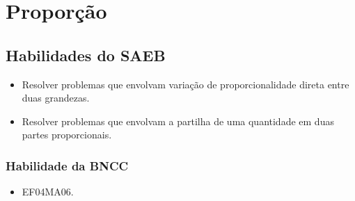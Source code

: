 \chapter{Proporção}

\vspace*{-1.5cm}

\section*{Habilidades do SAEB}

\begin{itemize}
\item Resolver problemas que envolvam variação de proporcionalidade direta
entre duas grandezas.

\item Resolver problemas que envolvam a partilha de uma quantidade em duas
partes proporcionais.
\end{itemize}

\subsection{Habilidade da BNCC}

\begin{itemize}
\item EF04MA06.
\end{itemize}

